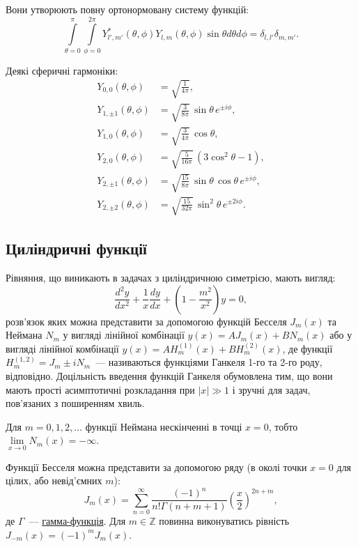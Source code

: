 Вони утворюють повну ортонормовану систему функцій:
\[
    \int\limits_{\theta=0}^{\pi} \int\limits_{\phi=0}^{2\pi} Y^*_{l',m'}(\theta, \phi) Y_{l,m}(\theta, \phi) \sin\theta d\theta d\phi  = \delta_{l,l'} \delta_{m,m'}.
\]

Деякі сферичні гармоніки:
\begin{align*}
	Y_{0,0}(\theta,\phi)     & =\sqrt{\frac{1} {4  \pi}},                                            \\
	Y_{1,\pm 1}(\theta,\phi) & =\sqrt{\frac{3} {8  \pi}} \, \sin\theta \, e^{\pm i\phi},             \\
	Y_{1,0}(\theta,\phi)     & =\sqrt{\frac{3} {4  \pi}}\, \cos\theta ,                              \\
	Y_{2,0}(\theta,\phi)     & =\sqrt{\frac{5} {16 \pi}}\, (3\cos^{2}\theta-1),                     \\
	Y_{2,\pm 1}(\theta,\phi) & =\sqrt{\frac{15}{8  \pi}}\, \sin\theta\, \cos\theta\, e^{\pm i\phi}, \\
	Y_{2,\pm 2}(\theta,\phi) & =\sqrt{\frac{15}{32 \pi}} \, \sin^{2}\theta \, e^{\pm2i\phi}.
\end{align*}

\subsection{Циліндричні функції}\setcounter{equation}{0}

Рівняння, що виникають в задачах з циліндричною симетрією, мають вигляд:
	\begin{equation}\label{eq:Bessel_eq}
		\frac{d^2y}{dx^2} + \frac1x\frac{dy}{dx} + \left(1 - \frac{m^2}{x^2} \right) y = 0,
	\end{equation}
	розв'язок яких можна представити за допомогою функцій Бесселя $J_m(x)$ та Неймана $N_m$ у вигляді лінійної комбінації $y(x) = A J_m(x) + B N_m(x)$ або у вигляді лінійної комбінації $y(x) = A H^{(1)}_m(x) + B H^{(2)}_m(x)$, де функції $H_m^{(1,2)} =J_m \pm i N_m$~--- називаються функціями Ганкеля 1-го та 2-го роду, відповідно. Доцільність введення функцій Ганкеля обумовлена тим, що вони мають прості асимптотичні розкладання при $|x| \gg 1$ і зручні для задач, пов'язаних з поширенням хвиль.

Для $m = 0,1,2,\ldots$ функції Неймана нескінченні в точці $x = 0$, тобто $\lim\limits_{x\to0}N_m(x) = -\infty$.

Функції Бесселя можна представити за допомогою ряду (в околі точки $x = 0$ для цілих, або невід'ємних $m$):
\begin{equation}\label{eq:J}
    J_m(x) = \sum_{n=0}^\infty \frac{(-1)^n}{n! \Gamma(n+m+1)} {\left({\frac{x}{2}}\right)}^{2n+m},
\end{equation}
де $ \Gamma$~--- \href{https://en.wikipedia.org/wiki/Gamma_function}{гамма-функція}. Для $m \in \mathbb{Z}$ повинна виконуватись рівність $J_{-m}(x)  = (-1)^m J_m(x)$.

